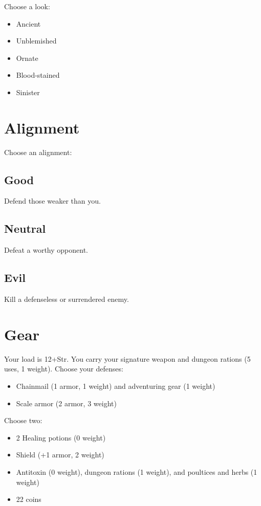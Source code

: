  Choose a look:
\begin{itemize}
\item Ancient
\item Unblemished
\item Ornate
\item Blood-stained
\item Sinister

\end{itemize}
\section{Alignment}


 Choose an alignment:
\subsection{Good}


 Defend those weaker than you.
\subsection{Neutral}


 Defeat a worthy opponent.
\subsection{Evil}


 Kill a defenseless or surrendered enemy.
\section{Gear}


 Your load is 12+Str. You carry your signature weapon and dungeon rations (5 uses, 1 weight). Choose your defenses:
\begin{itemize}
\item Chainmail (1 armor, 1 weight) and adventuring gear (1 weight)
\item Scale armor (2 armor, 3 weight)

\end{itemize}


 Choose two:
\begin{itemize}
\item 2 Healing potions (0 weight)
\item Shield (+1 armor, 2 weight)
\item Antitoxin (0 weight), dungeon rations (1 weight), and poultices and herbs (1 weight)
\item 22 coins

\end{itemize}
